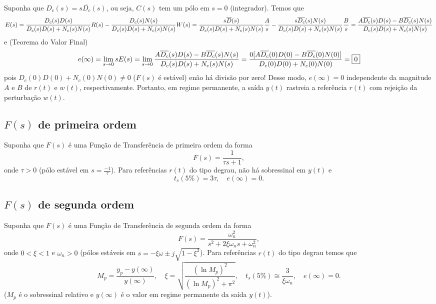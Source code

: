 \documentclass[
]{book}
\begin{document}
Suponha que \(D_c(s) = s\overline{D_c}(s)\), ou seja, \(C(s)\) tem um pólo em \(s=0\) (integrador). Temos que
\[
E(s) = \frac{D_c(s)D(s)}{D_c(s)D(s)+N_c(s)N(s)}R(s)-\frac{D_c(s)N(s)}{D_c(s)D(s)+N_c(s)N(s)}W(s) \\
= \frac{s\overline{D}(s)}{D_c(s)D(s)+N_c(s)N(s)}\frac{A}{s} - \frac{s\overline{D_c}(s)N(s)}{D_c(s)D(s)+N_c(s)N(s)}\frac{B}{s}\\
= \frac{A\overline{D_c}(s)D(s) - B\overline{D_c}(s)N(s)}{D_c(s)D(s)+N_c(s)N(s)}
\]
e (Teorema do Valor Final)
\[
e(\infty) = \lim\limits_{s\to0}{sE(s)} =
\lim\limits_{s\to0}{\frac{A\overline{D_c}(s)D(s) - B\overline{D_c}(s)N(s)}{D_c(s)D(s)+N_c(s)N(s)}} \\
= \frac{0[A\overline{D_c}(0)D(0) - B\overline{D_c}(0)N(0)]}{D_c(0)D(0)+N_c(0)N(0)} =
\boxed{0}
\]
pois \(D_c(0)D(0) + N_c(0)N(0) \neq 0\) (\(F(s)\) é estável) enão há divisão por zero! Desse modo, \(e(\infty) = 0\) independente da magnitude \(A\) e \(B\) de \(r(t)\) e \(w(t)\), respectivamente. Portanto, em regime permanente, a saída \(y(t)\) rastreia a referência \(r(t)\) com rejeição da perturbação \(w(t)\).

\hypertarget{fs-de-primeira-ordem}{%
\subsection{\texorpdfstring{\(F(s)\) de primeira ordem}{F(s) de primeira ordem}}\label{fs-de-primeira-ordem}}

Suponha que \(F(s)\) é uma Função de Transferência de primeira ordem da forma
\[
F(s) = \frac{1}{\tau s+1},
\]
onde \(\tau > 0\) (pólo estável em \(s=\frac{-1}{\tau}\)). Para referências \(r(t)\) do tipo degrau, não há sobressinal em \(y(t)\) e
\[
\boxed{t_s(5\%) = 3\tau, \quad e(\infty) =0}.
\]

\hypertarget{fs-de-segunda-ordem}{%
\subsection{\texorpdfstring{\(F(s)\) de segunda ordem}{F(s) de segunda ordem}}\label{fs-de-segunda-ordem}}

Suponha que \(F(s)\) é uma Função de Transferência de segunda ordem da forma
\[
F(s) = \frac{\omega_n^2}{s^2+2\xi\omega_ns+\omega_n^2},
\]
onde \(0<\xi<1\) e \(\omega_n>0\) (pólos estáveis em \(s=-\xi\omega \pm j \sqrt{1-\xi^2}\)). Para referências \(r(t)\) do tipo degrau temos que
\[
\boxed{M_p=\frac{y_p-y(\infty)}{y(\infty)}, \quad \xi=\sqrt{\frac{(\ln{M_p})^2}{(\ln{M_p})^2+\pi^2}}, \quad t_s(5\%) \cong \frac{3}{\xi\omega_n}, \quad e(\infty) =0}.
\]
(\(M_p\) é o sobressinal relativo e \(y(\infty)\) é o valor em regime permanente da saída \(y(t)\)).
\end{document}
